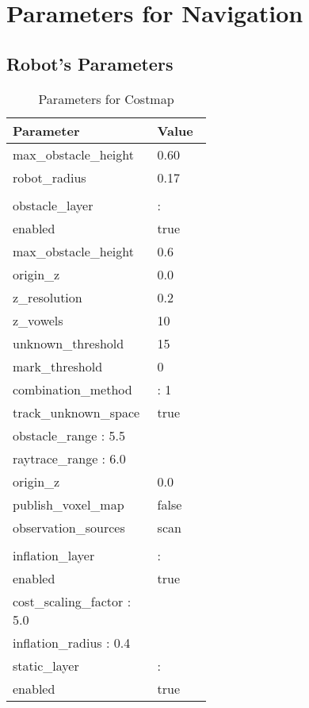 
\chapter{Parameters for Navigation} %

\label{Appendix1} %

\section{Robot's Parameters}
\begin{table*}[ht]
    \caption{Parameters for Costmap}
    \centering
    \begin{tabular}{p{0.25\linewidth}p{0.25\linewidth}}
    \hline
    Parameter & Value \\
    \hline
    max\_obstacle\_height & 0.60\\
    robot\_radius & 0.17\\
    \\
    obstacle\_layer & : \\
    enabled & true \\
    max\_obstacle\_height & 0.6 \\
    origin\_z & 0.0 \\
    z\_resolution & 0.2 \\
    z\_vowels & 10 \\
    unknown\_threshold & 15 \\
    mark\_threshold & 0 \\
    combination\_method & : 1\\
    track\_unknown\_space & true \\
    obstacle\_range : 5.5\\
    raytrace\_range : 6.0 \\
    origin\_z & 0.0 \\
    publish\_voxel\_map & false \\
    observation\_sources & scan \\
    \\
    inflation\_layer & : \\
    enabled & true \\
    cost\_scaling\_factor : 5.0 \\
    inflation\_radius : 0.4 \\
    static\_layer & : \\
    enabled & true \\
    \hline
    \end{tabular}
\end{table*}

